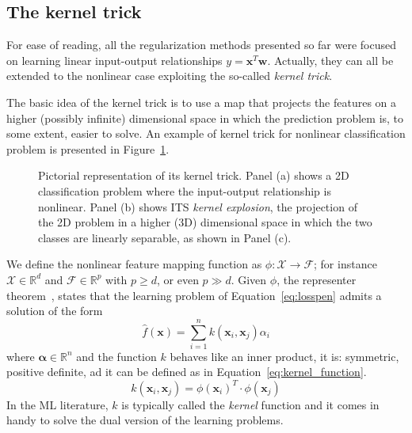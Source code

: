 			\subsection{The kernel trick} \label{sec:kernel_trick}
			For ease of reading, all the regularization methods presented so far were focused on learning linear input-output relationships $y = \bm{x}^T\bm{w}$. Actually, they can all be extended to the nonlinear case exploiting the so-called \textit{kernel trick}.

			The basic idea of the kernel trick is to use a map that projects the features on a higher (possibly infinite) dimensional space in which the prediction problem is, to some extent, easier to solve. An example of kernel trick for nonlinear classification problem is presented in Figure~\ref{fig:kernel_trick}.

			\begin{figure}[!h]
				\centering
				\hfill%
				\caption{Pictorial representation of its kernel trick. Panel (a) shows a 2D classification problem where the input-output relationship is nonlinear. Panel (b) shows ITS \textit{kernel explosion}, \ie the projection of the 2D problem in a higher (3D) dimensional space in which the two classes are linearly separable, as shown in Panel (c).}\label{fig:kernel_trick}
			\end{figure}

			We define the nonlinear feature mapping function as $\phi: \mathcal{X} \rightarrow \mathcal{F}$; for instance $\mathcal{X} \in \mathbb{R}^d$ and $\mathcal{F} \in \mathbb{R}^p$ with $p \geq d$, or even $p \gg d$.
			Given $\phi$, the representer theorem~\cite{smola1998learning}, states that the learning problem of Equation~\eqref{eq:losspen} admits a solution of the form
			$$
			\hat f(\bm{x}) = \sum_{i=1}^n k(\bm{x}_i, \bm{x}_j) \alpha_i
			$$
			where $\bm{\alpha} \in \mathbb{R}^n$ and the function $k$ behaves like an inner product, \ie it is: symmetric, positive definite, ad it can be defined as in Equation~\eqref{eq:kernel_function}.
			\begin{equation} \label{eq:kernel_function}
				k(\bm{x}_i, \bm{x}_j) =  \phi{(\bm{x}_i)}^T \cdot \phi{(\bm{x}_j)} %
			\end{equation}
			In the ML literature, $k$ is typically called the \textit{kernel} function and it comes in handy to solve the dual version of the learning problems.

